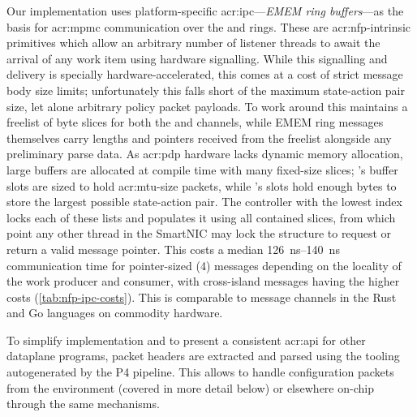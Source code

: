 Our implementation uses platform-specific \gls{acr:ipc}---\emph{EMEM ring buffers}---as the basis for \gls{acr:mpmc} communication over the \inring{} and \outring{} rings.
These are \gls{acr:nfp}-intrinsic primitives which allow an arbitrary number of listener threads to await the arrival of any work item using hardware signalling.
While this signalling and delivery is specially hardware-accelerated, this comes at a cost of strict message body size limits; unfortunately this falls short of the maximum state-action pair size, let alone arbitrary policy packet payloads.
To work around this \approachshort{} maintains a freelist of byte slices for both the \inring{} and \outring{} channels, while EMEM ring messages themselves carry lengths and pointers received from the freelist alongside any preliminary parse data.
As \gls{acr:pdp} hardware lacks dynamic memory allocation, large buffers are allocated at compile time with many fixed-size slices; \inring{}'s buffer slots are sized to hold \gls{acr:mtu}-size packets, while \outring{}'s slots hold enough bytes to store the largest possible state-action pair.
The \approachshort{} controller with the lowest index locks each of these lists and populates it using all contained slices, from which point any other thread in the SmartNIC may lock the structure to request or return a valid message pointer.
This costs a median \qtyrange{126}{140}{\nano\second} communication time for pointer-sized (\qty{4}{\byte}) messages depending on the locality of the work producer and consumer, with cross-island messages having the higher costs (\cref{tab:nfp-ipc-costs}).
This is comparable to message channels in the Rust and Go languages on commodity hardware.

To simplify implementation and to present a consistent \gls{acr:api} for other dataplane programs, packet headers are extracted and parsed using the tooling autogenerated by the P4 pipeline.
This allows \approachshort{} to handle configuration packets from the environment (covered in more detail below) or elsewhere on-chip through the same mechanisms.


